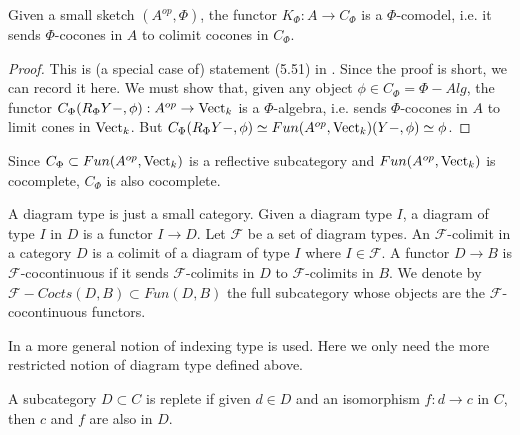 \begin{lemma}

  \noindent Given a small sketch $(A^{op},\Phi)$, the functor $K_{\Phi}:A\to
  C_{\Phi}$ is a $\Phi$-comodel, i.e. it sends $\Phi$-cocones in $A$ to
  colimit cocones in $C_{\Phi}$.
\end{lemma}

\begin{proof}
  This is (a special case of) statement (5.51) in
  \cite{kelly/basic-concepts-enriched}. Since the proof is short, we can
  record it here. We must show that, given any object $\phi\in
  C_{\Phi}=\Phi-Alg$, the functor $C_{\Phi}(R_{\Phi}Y-,\phi):A^{op}\to\operatorname{Vect}_k$
  is a $\Phi$-algebra, i.e. sends $\Phi$-cocones in $A$ to limit cones in
  $\operatorname{Vect}_k$. But $C_{\Phi}(R_{\Phi}Y-,\phi)\simeq
  Fun(A^{op},\operatorname{Vect}_k)(Y-,\phi)\simeq\phi$.
\end{proof}


\begin{remark}

  \noindent Since $C_{\Phi}\subset Fun(A^{op},\operatorname{Vect}_k)$ is a reflective
  subcategory and $Fun(A^{op},\operatorname{Vect}_k)$ is cocomplete, $C_{\Phi}$ is also
  cocomplete.
\end{remark}

\begin{definition}
  \noindent A diagram type is just a small category. Given a diagram type $I$,
  a diagram of type $I$ in $D$ is a functor $I\to D$. Let $\mathcal{F}$ be a
  set of diagram types. An $\mathcal{F}$-colimit in a category $D$ is a
  colimit of a diagram of type $I$ where $I\in \mathcal{F}$. A functor $D\to
  B$ is $\mathcal{F}$-cocontinuous if it sends $\mathcal{F}$-colimits in $D$
  to $\mathcal{F}$-colimits in $B$. We denote by
  $\mathcal{F}-Cocts(D,B)\subset Fun(D,B)$ the full subcategory whose objects
  are the $\mathcal{F}$-cocontinuous functors.
\end{definition}

\begin{remark}
  In \cite{kelly/basic-concepts-enriched} a more general notion of indexing
  type is used. Here we only need the more restricted notion of diagram type
  defined above.
\end{remark}

\begin{definition}

  \noindent A subcategory $D\subset C$ is replete if given $d\in D$ and an
  isomorphism $f:d\to c$ in $C$, then $c$ and $f$ are also in $D$.
\end{definition}


